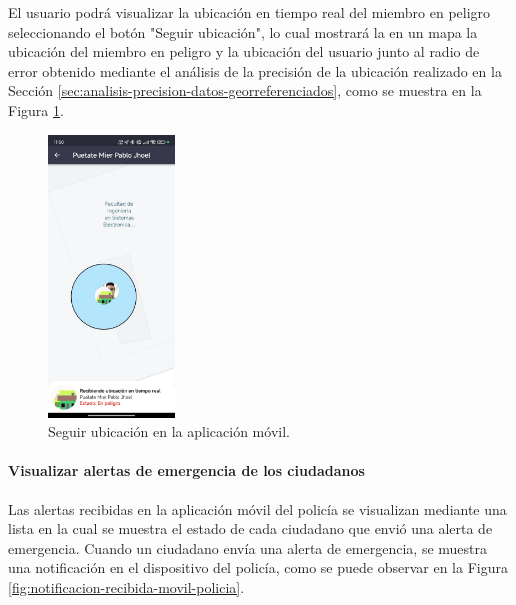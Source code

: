 El usuario podrá visualizar la ubicación en tiempo real del miembro en peligro seleccionando el botón "Seguir ubicación",
lo cual mostrará la en un mapa la ubicación del miembro en peligro y la ubicación del usuario junto al radio de error obtenido
mediante el análisis de la precisión de la ubicación realizado en la Sección \ref{sec:analisis-precision-datos-georreferenciados},
como se muestra en la Figura \ref{fig:seguir-ubicacion-movil}.

\begin{figure}[H]
    \centering
    \includegraphics[width=0.3\textwidth]{chapters/III-resultados-y-discusion/resources/images/seguir-ubicacion-movil.png}
    \caption{Seguir ubicación en la aplicación móvil.}
    \label{fig:seguir-ubicacion-movil}
\end{figure}

\paragraph{Visualizar alertas de emergencia de los ciudadanos}

Las alertas recibidas en la aplicación móvil del policía se visualizan mediante una lista en la cual se muestra el estado de cada
ciudadano que envió una alerta de emergencia. Cuando un ciudadano envía una alerta de emergencia, se muestra una notificación en el
dispositivo del policía, como se puede observar en la Figura \ref{fig:notificacion-recibida-movil-policia}.

